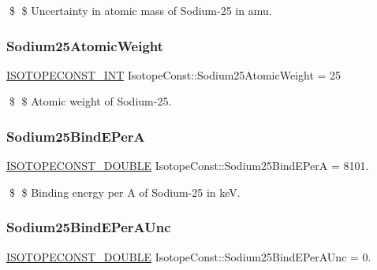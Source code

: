 \$ \$ Uncertainty in atomic mass of Sodium-\/25 in amu. \mbox{\label{group___isotope_const-_sodium-_na25_ga8767d5ff0e5f0c6ad0cf5ce614b65c72}} 
\subsubsection{\texorpdfstring{Sodium25\+Atomic\+Weight}{Sodium25AtomicWeight}}
{\footnotesize\ttfamily \mbox{\hyperlink{group___isotope_const-_macros_ga5f18360b3e99483a35c32d789e62621c}{I\+S\+O\+T\+O\+P\+E\+C\+O\+N\+S\+T\+\_\+\+I\+NT}} Isotope\+Const\+::\+Sodium25\+Atomic\+Weight = 25}

\$ \$ Atomic weight of Sodium-\/25. \mbox{\label{group___isotope_const-_sodium-_na25_ga4b747d8c9862a6e46bc1d4939eaba9bb}} 
\subsubsection{\texorpdfstring{Sodium25\+Bind\+E\+PerA}{Sodium25BindEPerA}}
{\footnotesize\ttfamily \mbox{\hyperlink{group___isotope_const-_macros_ga8f45a7272ce02c0b4c65c44636ed719a}{I\+S\+O\+T\+O\+P\+E\+C\+O\+N\+S\+T\+\_\+\+D\+O\+U\+B\+LE}} Isotope\+Const\+::\+Sodium25\+Bind\+E\+PerA = 8101.}

\$ \$ Binding energy per A of Sodium-\/25 in keV. \mbox{\label{group___isotope_const-_sodium-_na25_gaeed1a75045992f0a7dabf8bfb02ec87f}} 
\subsubsection{\texorpdfstring{Sodium25\+Bind\+E\+Per\+A\+Unc}{Sodium25BindEPerAUnc}}
{\footnotesize\ttfamily \mbox{\hyperlink{group___isotope_const-_macros_ga8f45a7272ce02c0b4c65c44636ed719a}{I\+S\+O\+T\+O\+P\+E\+C\+O\+N\+S\+T\+\_\+\+D\+O\+U\+B\+LE}} Isotope\+Const\+::\+Sodium25\+Bind\+E\+Per\+A\+Unc = 0.}

